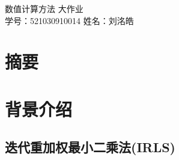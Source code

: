 \documentclass{ctexart}
\begin{document}








\begin{center}
	\Large{数值计算方法 大作业} \\
	\normalsize{学号：521030910014}
	\normalsize{姓名：刘洺皓}
	\vspace{0.4cm}
\end{center}

\section{摘要}

\section{背景介绍}



\subsection{迭代重加权最小二乘法(IRLS)}
\end{document}
